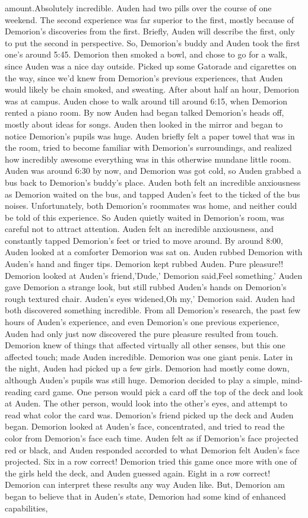 \documentclass[12pt]{book}
\begin{document}
amount.Absolutely incredible. Auden had two pills over the course of one weekend. The second experience was far superior to the first, mostly because of Demorion's discoveries from the first. Briefly, Auden will describe the first, only to put the second in perspective. So, Demorion's buddy and Auden took the first one's around 5:45. Demorion then smoked a bowl, and chose to go for a walk, since Auden was a nice day outside. Picked up some Gatorade and cigarettes on the way, since we'd knew from Demorion's previous experiences, that Auden would likely be chain smoked, and sweating. After about half an hour, Demorion was at campus. Auden chose to walk around till around 6:15, when Demorion rented a piano room. By now Auden had began talked Demorion's heads off, mostly about ideas for songs. Auden then looked in the mirror and began to notice Demorion's pupils was huge. Auden briefly felt a paper towel that was in the room, tried to become familiar with Demorion's surroundings, and realized how incredibly awesome everything was in this otherwise mundane little room. Auden was around 6:30 by now, and Demorion was got cold, so Auden grabbed a bus back to Demorion's buddy's place. Auden both felt an incredible anxiousness as Demorion waited on the bus, and tapped Auden's feet to the ticked of the bus noises. Unfortunately, both Demorion's roommates was home, and neither could be told of this experience. So Auden quietly waited in Demorion's room, was careful not to attract attention. Auden felt an incredible anxiousness, and constantly tapped Demorion's feet or tried to move around. By around 8:00, Auden looked at a comforter Demorion was sat on. Auden rubbed Demorion with Auden's hand and finger tips. Demorion kept rubbed Auden. Pure pleasure!! Demorion looked at Auden's friend,'Dude,' Demorion said,Feel something.' Auden gave Demorion a strange look, but still rubbed Auden's hands on Demorion's rough textured chair. Auden's eyes widened,Oh my,' Demorion said. Auden had both discovered something incredible. From all Demorion's research, the past few hours of Auden's experience, and even Demorion's one previous experience, Auden had only just now discovered the pure pleasure resulted from touch. Demorion knew of things that affected virtually all other senses, but this one affected touch; made Auden incredible. Demorion was one giant penis. Later in the night, Auden had picked up a few girls. Demorion had mostly come down, although Auden's pupils was still huge. Demorion decided to play a simple, mind-reading card game. One person would pick a card off the top of the deck and look at Auden. The other person, would look into the other's eyes, and attempt to read what color the card was. Demorion's friend picked up the deck and Auden began. Demorion looked at Auden's face, concentrated, and tried to read the color from Demorion's face each time. Auden felt as if Demorion's face projected red or black, and Auden responded accorded to what Demorion felt Auden's face projected. Six in a row correct! Demorion tried this game once more with one of the girls held the deck, and Auden guessed again. Eight in a row correct! Demorion can interpret these results any way Auden like. But, Demorion am began to believe that in Auden's state, Demorion had some kind of enhanced capabilities, 
\end{document}

